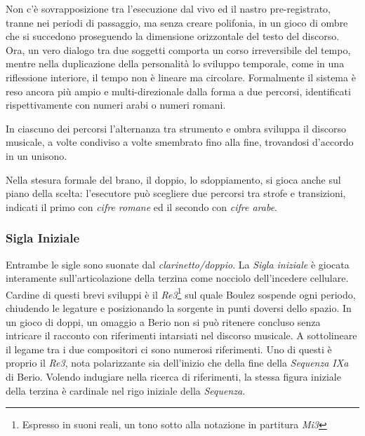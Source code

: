 Non c'è sovrapposizione tra l'esecuzione dal vivo ed il nastro pre-registrato, tranne nei periodi di passaggio, ma  senza creare polifonia, in un gioco di ombre che si succedono proseguendo la dimensione orizzontale del testo del discorso. Ora, un vero dialogo tra due soggetti comporta un corso irreversibile del tempo, mentre nella duplicazione della personalità lo sviluppo temporale, come in una riflessione interiore, il tempo non è lineare ma circolare. Formalmente il sistema è reso ancora più ampio e multi-direzionale dalla forma a due percorsi, identificati rispettivamente con numeri arabi o numeri romani.


In ciascuno dei percorsi l'alternanza tra strumento e ombra sviluppa il discorso musicale, a volte condiviso a volte smembrato fino alla fine, trovandosi d'accordo in un unisono.

Nella stesura formale del brano, il doppio, lo sdoppiamento, si gioca anche sul piano della scelta: l'esecutore può scegliere due percorsi tra strofe e transizioni, indicati il primo con \emph{cifre romane} ed il secondo con \emph{cifre arabe}. %


\subsubsection*{Sigla Iniziale}

Entrambe le sigle sono suonate dal \emph{clarinetto/doppio}. La \emph{Sigla iniziale} è giocata interamente sull'articolazione della terzina come nocciolo dell'incedere cellulare. Cardine di questi brevi sviluppi è il \emph{Re3}\footnote{Espresso in suoni reali, un tono sotto alla notazione in partitura \emph{Mi3}} sul quale Boulez sospende ogni periodo, chiudendo le legature e posizionando la sorgente in punti doversi dello spazio. In un gioco di doppi, un omaggio a Berio non si può ritenere concluso senza intricare il racconto con riferimenti intarsiati nel discorso musicale. A sottolineare il legame tra i due compositori ci sono numerosi riferimenti. Uno di questi è proprio il \emph{Re3}, nota polarizzante sia dell'inizio che della fine della \emph{Sequenza IXa} di Berio.
Volendo indugiare nella ricerca di riferimenti, la stessa figura iniziale della terzina è cardinale nel rigo iniziale della \emph{Sequenza}.

